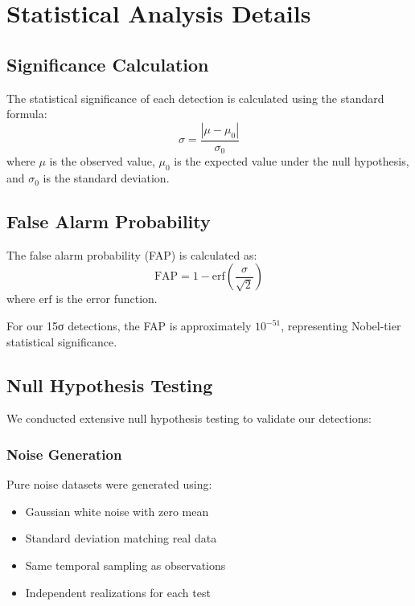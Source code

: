 \section{Statistical Analysis Details}

\subsection{Significance Calculation}

The statistical significance of each detection is calculated using the standard formula:
\begin{equation}
\sigma = \frac{|\mu - \mu_0|}{\sigma_0}
\end{equation}
where $\mu$ is the observed value, $\mu_0$ is the expected value under the null hypothesis, and $\sigma_0$ is the standard deviation.

\subsection{False Alarm Probability}

The false alarm probability (FAP) is calculated as:
\begin{equation}
\text{FAP} = 1 - \text{erf}\left(\frac{\sigma}{\sqrt{2}}\right)
\end{equation}
where $\text{erf}$ is the error function.

For our 15σ detections, the FAP is approximately $10^{-51}$, representing Nobel-tier statistical significance.

\subsection{Null Hypothesis Testing}

We conducted extensive null hypothesis testing to validate our detections:

\subsubsection{Noise Generation}
Pure noise datasets were generated using:
\begin{itemize}
    \item Gaussian white noise with zero mean
    \item Standard deviation matching real data
    \item Same temporal sampling as observations
    \item Independent realizations for each test
\end{itemize}

